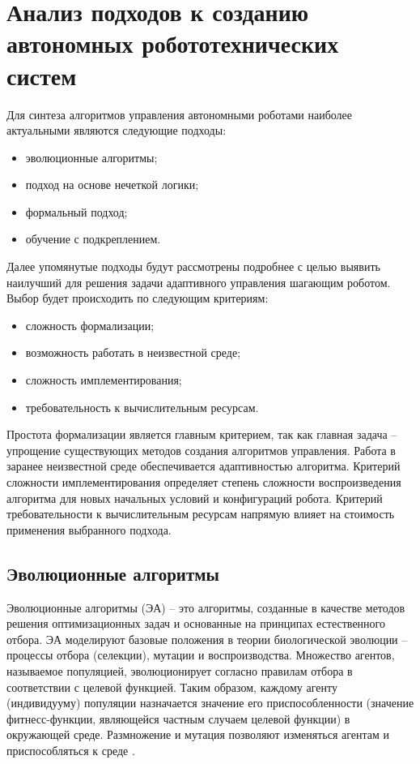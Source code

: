 \section{Анализ подходов к созданию автономных робототехнических систем} \label{literature}

Для синтеза алгоритмов управления автономными роботами наиболее актуальными являются следующие подходы:
\begin{itemize}
	\item эволюционные алгоритмы;
	\item подход на основе нечеткой логики;
	\item формальный подход;
	\item обучение с подкреплением.

\end{itemize}

Далее упомянутые подходы будут рассмотрены подробнее с целью выявить наилучший для решения задачи адаптивного управления шагающим роботом. 
Выбор будет происходить по следующим критериям:
\begin{itemize}
	\item сложность формализации;
	\item возможность работать в неизвестной среде;
	\item сложность имплементирования;
	\item требовательность к вычислительным ресурсам.
\end{itemize}

Простота формализации является главным критерием, так как главная задача -- упрощение существующих методов создания алгоритмов управления. 
Работа в заранее неизвестной среде обеспечивается адаптивностью алгоритма. 
Критерий сложности имплементирования определяет степень сложности воспроизведения алгоритма для новых начальных условий и конфигураций робота. 
Критерий требовательности к вычислительным ресурсам напрямую влияет на стоимость применения выбранного подхода.


\subsection{Эволюционные алгоритмы}

Эволюционные алгоритмы (ЭА) – это алгоритмы, созданные в качестве методов решения оптимизационных задач и основанные на принципах естественного отбора. 
ЭА моделируют базовые положения в теории биологической эволюции -- процессы отбора (селекции), мутации и воспроизводства. 
Множество агентов, называемое популяцией, эволюционирует согласно правилам отбора в соответствии с целевой функцией. Таким образом, каждому агенту (индивидууму) популяции назначается значение его приспособленности (значение фитнесс-функции, являющейся частным случаем целевой функции) в окружающей среде. 
Размножение и мутация позволяют изменяться агентам и приспособляться к среде \cite{evolution}.

